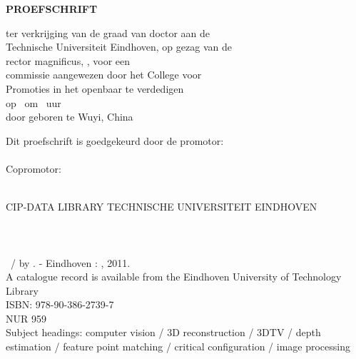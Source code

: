 \pagestyle{empty}
\vspace*{0.2\textheight}
\begin{center}
\LARGE \gettitle
\end{center}
\newpage
\thispagestyle{empty}
\mbox{}
\newpage

\vspace*{0.2\textheight}
\begin{center}
\LARGE \gettitle
\end{center}
\vfill
\vfill

\begin{center}
  {\bfseries \Large PROEFSCHRIFT}
\vfill
\vfill

  ter verkrijging van de graad van doctor aan de\\
  Technische Universiteit Eindhoven, op gezag van de \\
  rector magnificus, \rectormagnificus, voor een \\
  commissie aangewezen door het College voor\\
  Promoties in het openbaar te verdedigen \\
  op \datepromonl \ om \timepromo~uur\\
\vfill
  door
\vfill
 \getauthor
\vfill
  geboren te Wuyi, China
\end{center}

\newpage

\begingroup
\setlength{\parindent}{0pt}
\setlength{\parskip}{\baselineskip}\small
{}
Dit proefschrift is goedgekeurd door de promotor:\\
\linebreak
\linebreak
\promoone \\
\linebreak
\linebreak
Copromotor:\\
\promotwo \\

\vfill
\vfill
\parindent=0pt

\hrulefill

\vspace{0.0cm}
CIP-DATA LIBRARY TECHNISCHE UNIVERSITEIT EINDHOVEN\\\\
\getauthor\\\\
\gettitle~/ by \getauthor. - Eindhoven : \getuniversity, 2011.\\
A catalogue record is available from the Eindhoven University of Technology Library\\
ISBN: 978-90-386-2739-7\\
NUR 959\\
Subject headings: computer vision / 3D reconstruction / 3DTV / depth estimation / feature point matching / critical configuration / image processing

